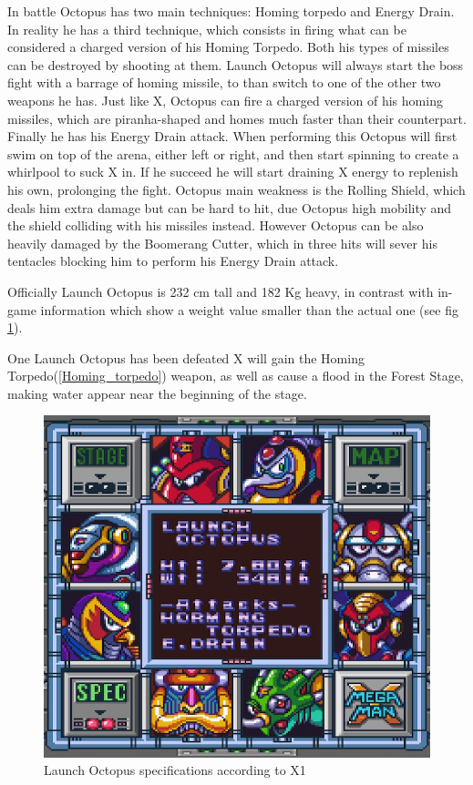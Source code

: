 In battle Octopus has two main techniques: Homing torpedo and Energy Drain. In reality he has a third technique, which consists in firing what can be considered a charged version of his Homing Torpedo. Both his types of missiles can be destroyed by shooting at them. Launch Octopus will always start the boss fight with a barrage of homing missile, to than switch to one of the other two weapons he has. Just like X, Octopus can fire a charged version of his homing missiles, which are piranha-shaped and homes much faster than their counterpart. Finally he has his Energy Drain attack. When performing this Octopus will first swim on top of the arena, either left or right, and then start spinning to create a whirlpool to suck X in. If he succeed he will start draining X energy to replenish his own, prolonging the fight. Octopus main weakness is the Rolling Shield, which deals him extra damage but can be hard to hit, due Octopus high mobility and the shield colliding with his missiles instead. However Octopus can be also heavily damaged by the Boomerang Cutter, which in three hits will sever his tentacles blocking him to perform his Energy Drain attack. 

Officially\cite{wayback:X_resources} Launch Octopus is 232 cm tall and 182 Kg heavy, in contrast with in-game information\cite{wiki:Launch_Octopus} which show a weight value smaller than the actual one (see fig \ref{Octopus_specs}).

One Launch Octopus has been defeated X will gain the Homing Torpedo(\ref{Homing_torpedo}) weapon, as well as cause a flood in the Forest Stage, making water appear near the beginning of the stage.
\begin{figure}[htp]
	\centering
	\includegraphics[width=0.6\linewidth]{figures/X1/Launch_octopus_specs.png}
	\caption{Launch Octopus specifications according to X1}
	\label{Octopus_specs}
\end{figure}

